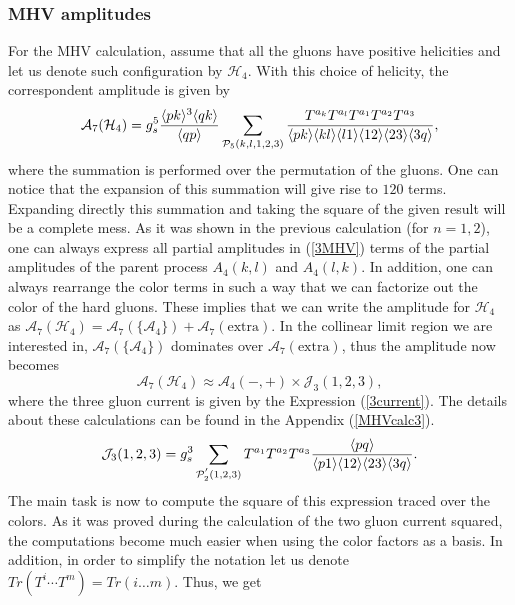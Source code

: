 \subsubsection{MHV amplitudes}

For the MHV calculation, assume that all the gluons have positive helicities and let us denote such configuration by $\mathcal{H}_4$. With this choice of helicity, the correspondent amplitude is given by 
\begin{equation}
\mathcal{A}_7 (\mathcal{H}_4)=g^5_s \frac{\langle pk\rangle^3 \langle qk\rangle}{\langle qp\rangle} \sum_{\mathcal{P}_5(k,l,1,2,3)} \frac{T^{a_k}T^{a_l}T^{a_1}T^{a_2}T^{a_3}}{\langle pk\rangle \langle kl\rangle \langle l1\rangle \langle12\rangle \langle23\rangle \langle3q\rangle},
\label{3MHV}
\end{equation}
where the summation is performed over the permutation of the gluons. One can notice that the expansion of this summation will give rise to $120$ terms. Expanding directly this summation and taking the square of the given result will be a complete mess. As it was shown in the previous calculation (for $n=1,2$), one can always express all partial amplitudes in (\ref{3MHV}) terms of the partial amplitudes of the parent process $A_4(k,l)$ and $A_4(l,k)$. In addition, one can always rearrange the color terms in such a way that we can factorize out the color of the hard gluons. These implies that we can write the amplitude for $\mathcal{H}_4$ as $\mathcal{A}_7(\mathcal{H}_4)=\mathcal{A}_7(\{\mathcal{A}_4\})+\mathcal{A}_7(\text{extra})$. In the collinear limit region we are interested in, $\mathcal{A}_7(\{\mathcal{A}_4\})$ dominates over $\mathcal{A}_7(\text{extra})$, thus the amplitude now becomes
\begin{equation}
\mathcal{A}_7(\mathcal{H}_4) \approx \mathcal{A}_4(-,+) \times \mathcal{J}_3(1,2,3),
\end{equation}
where the three gluon current is given by the Expression (\ref{3current}). The details about these calculations can be found in the Appendix (\ref{MHVcalc3}). 
\begin{equation}
\mathcal{J}_3(1,2,3)=g^3_s \sum_{\mathcal{P}^{'}_2(1,2,3)} T^{a_1} T^{a_2} T^{a_3} \frac{\langle pq\rangle}{\langle p1\rangle \langle12\rangle \langle23\rangle \langle3q\rangle}.
\label{3current}
\end{equation}
The main task is now to compute the square of this expression traced over the colors. As it was proved during the calculation of the two gluon current squared, the computations become much easier when using the color factors as a basis. In addition, in order to simplify the notation let us denote $Tr(T^{i} \cdots T^{m})=Tr(i \dots m)$. Thus, we get 
